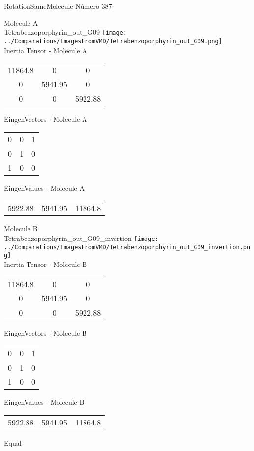 \vtab[-2cm]
\begin{center}
{\large RotationSameMolecule \tab Número 387}
\end{center}
\begin{multicols}{2}
\begin{center}

Molecule A \\ 
Tetrabenzoporphyrin\_out\_G09
\texttt{[image: ../Comparations/ImagesFromVMD/Tetrabenzoporphyrin\_out\_G09.png]}
\\
Inertia Tensor - Molecule A \\
\vtab

\begin{tabular}{|c c c|}
11864.8	 & 	0	 & 	0	 \\
0	 & 	5941.95	 & 	0	 \\
0	 & 	0	 & 	5922.88
\end{tabular}

\vtab
 EingenVectors - Molecule A     \\
\vtab
\begin{tabular}{|c c c|}
0	 & 	0	 & 	1	 \\
0	 & 	1	 & 	0	 \\
1	 & 	0	 & 	0
\end{tabular}

\vtab
 EingenValues - Molecule A     \\
\vtab
\begin{tabular}{|c c c|}
5922.88	 & 	5941.95	 & 	11864.8	 \\
\end{tabular}
\columnbreak

Molecule B \\ 
Tetrabenzoporphyrin\_out\_G09\_invertion
\texttt{[image: ../Comparations/ImagesFromVMD/Tetrabenzoporphyrin\_out\_G09\_invertion.png]}
\\
Inertia Tensor - Molecule B \\
\vtab

\begin{tabular}{|c c c|}
11864.8	 & 	0	 & 	0	 \\
0	 & 	5941.95	 & 	0	 \\
0	 & 	0	 & 	5922.88
\end{tabular}

\vtab
 EingenVectors - Molecule B     \\
\vtab
\begin{tabular}{|c c c|}
0	 & 	0	 & 	1	 \\
0	 & 	1	 & 	0	 \\
1	 & 	0	 & 	0
\end{tabular}

\vtab
 EingenValues - Molecule B     \\
\vtab
\begin{tabular}{|c c c|}
5922.88	 & 	5941.95	 & 	11864.8	 \\
\end{tabular}

\end{center}
\end{multicols}
\begin{center}
\vtab
\vtab
\textcolor{NavyBlue}{\Large Equal}
\end{center}

